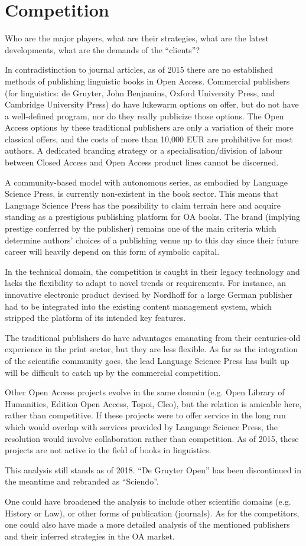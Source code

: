 \documentclass[nonflat,smallfont
]{langsci/langscibook}
\newcommand{\background}[1]{ 
  \vspace{5mm}
  \renewcommand{\tblslinecolour}{lsDarkBlue}
  \tblssy[red]{explore2}{Background}{\vspace*{-5mm}#1}
}
\newcommand{\langscisolution}[1]{
  \renewcommand{\tblslinecolour}{lsLightBlue}
  \tblssy{langsci}{LangSci solution}{\vspace*{-5mm}#1}
}
\newcommand{\evaluation}[1]{
  \renewcommand{\tblslinecolour}{lsLightOrange}
  \tblssy{receipt}{Evaluation}{\vspace*{-5mm}#1}
}
\newcommand{\othersolutions}[1]{
  \renewcommand{\tblslinecolour}{lsDarkGreenOne}
  \tblssy{more}{Other solutions}{\vspace*{-5mm}#1}
}
\renewcommand{\tblssy}[4][black!12]{%
  \renewcommand{\langscisymbol}{#2}\renewcommand{\tblsboxcolor}{#1}
  \begin{mdframed}[style=yellowexercise,frametitle={#3}]
    #4
  \end{mdframed}
}
\begin{document}
\section{Competition} 
\background{Who are the major players, what are their strategies, what are the latest developments, what are the demands of the ``clients''?}
\langscisolution{
In contradistinction to journal articles, as of 2015 there are no established methods of publishing linguistic books in Open Access. Commercial publishers (for linguistics: de Gruyter, John Benjamins, Oxford University Press, and Cambridge University Press) do have lukewarm options on offer, but do not have a well-de\-fin\-ed program, nor do they really publicize those options. The Open Access options by these traditional publishers are only a variation of their more classical offers, and the costs of more than 10,000 EUR are prohibitive for most authors. A dedicated branding strategy or a specialisation\slash division of labour between Closed Access and Open Access product lines cannot be discerned.

A community-based model with autonomous series, as embodied by Language Science Press, is currently non-existent in the book sector. This means that Language Science Press has the possibility to claim terrain here and acquire standing as a prestigious publishing platform for OA books.  The brand (implying prestige conferred by the publisher) remains one of the main criteria which determine authors' choices of a publishing venue up to this day since their future career will heavily depend on this form of symbolic capital. 

In the technical domain, the competition is caught in their legacy technology and lacks the flexibility to adapt to novel trends or requirements. For instance, an innovative electronic product devised by Nordhoff for a large German publisher had to be integrated into the existing content management system, which stripped the platform of its intended key features. 

The traditional publishers do have advantages emanating from their centuries-old experience in the print sector, but they are less flexible. As far as the integration of the scientific community goes, the lead Language Science Press has built up will be difficult to catch up by the commercial competition.  

Other Open Access projects evolve in the same domain (e.g. Open Library of Humanities, Edition Open Access, Topoi, Cleo), but the relation is amicable here, rather than competitive.
If these projects were to offer service in the long run which would overlap with services provided by Language Science Press, the resolution would involve collaboration rather than competition. As of 2015, these projects are not active in the field of books in linguistics. 
}
\evaluation{This analysis still stands as of 2018. ``De Gruyter Open'' has been discontinued in the meantime and rebranded as ``Sciendo''. }
\largerpage
\othersolutions{One could have broadened the analysis to include other scientific domains (e.g. History or Law), or other forms of publication (journals). As for the competitors, one could also have made a more detailed analysis of the mentioned publishers and their inferred strategies in the OA market.}
 
\end{document}
